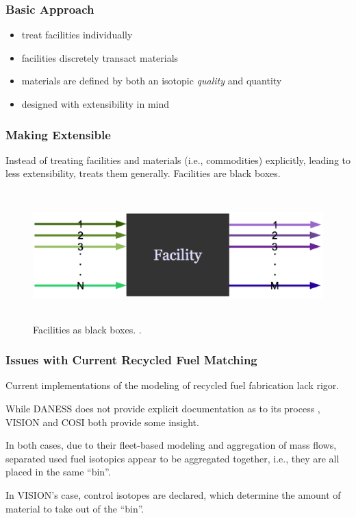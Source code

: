 \begin{frame}[ctb!]
  \frametitle{Basic \Cyclus Approach}

  \begin{itemize}
    \item treat facilities individually
    \item facilities discretely transact materials
    \item materials are defined by both an isotopic \textit{quality} and
      quantity
    \item designed with extensibility in mind
  \end{itemize}

\end{frame}

\begin{frame}[ctb!]
  \frametitle{Making \Cyclus Extensible}
  
  Instead of treating facilities and materials (i.e., commodities) explicitly,
  leading to less extensibility, \Cyclus treats them generally. Facilities are
  black boxes.
  
  \begin{figure}
    \includegraphics[height=5cm]{./images/facs.eps}
    \caption{Facilities as black boxes. \cite{cyclus2012}.}
    \label{fig:facs}  
  \end{figure}

\end{frame}

\begin{frame}[ctb!]
  \frametitle{Issues with Current Recycled Fuel Matching}
  
  Current implementations of the modeling of recycled fuel fabrication lack
  rigor.

  \vspace{0.2cm}

  While DANESS does not provide explicit documentation as to its process
  \cite{durpel_daness_2003}, VISION and COSI both provide some insight.
  
  \vspace{0.2cm}

  In both cases, due to their fleet-based modeling and aggregation of mass
  flows, separated used fuel isotopics appear to be aggregated together, i.e.,
  they are all placed in the same ``bin''.
  
  \vspace{0.2cm}

  In VISION's case, control isotopes are declared, which determine the amount of
  material to take out of the ``bin''.\cite{yacout_vision_2006}
\end{frame}

